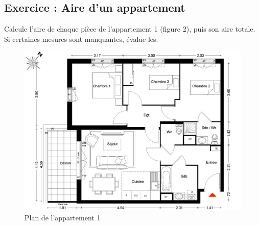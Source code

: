 \documentclass[utf8, a4paper, 12 pt]{article}
\begin{document}
        \subsection{Exercice : Aire d'un appartement}
            Calcule l'aire de chaque pièce de l'appartement 1 (figure 2), puis son aire totale.
            Si certaines mesures sont manquantes, évalue-les.
            \begin{figure}[H]
                \centering
                \includegraphics[width=1\linewidth]{img/appartement1.PNG}
                \caption{Plan de l'appartement 1}
            \end{figure}
\end{document}
